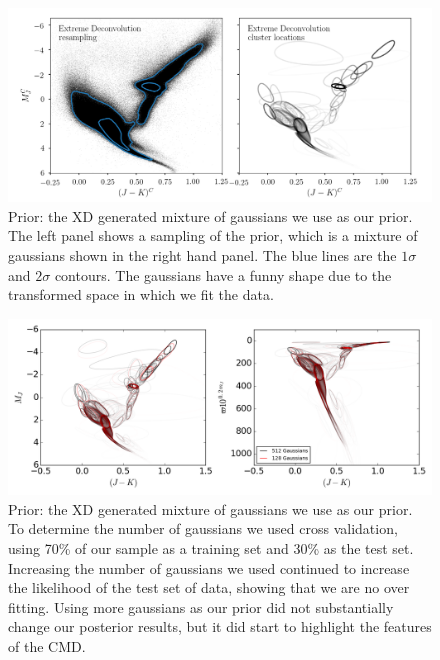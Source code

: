 \documentclass[modern]{aastex61}
\begin{document}
\begin{figure}
\centering
  \includegraphics[width=\textwidth]{prior_ngauss128.png}
\caption{Prior: the XD generated mixture of gaussians we use as our prior. The left panel shows a sampling of the prior, which is a mixture of gaussians shown in the right hand panel. The blue lines are the $1\sigma$ and $2\sigma$ contours. The gaussians have a funny shape due to the transformed space in which we fit the data.}
\label{fig:prior}
\end{figure}

\begin{figure}
\centering
  \includegraphics[width=\textwidth]{priorNgaussComparison.png}
\caption{Prior: the XD generated mixture of gaussians we use as our prior. To determine the number of gaussians we used cross validation, using 70\% of our sample as a training set and 30\% as the test set. Increasing the number of gaussians we used continued to increase the likelihood of the test set of data, showing that we are no over fitting. Using more gaussians as our prior did not substantially change our posterior results, but it did start to highlight the features of the CMD.}
\label{fig:priorCompare}
\end{figure}
\end{document}
